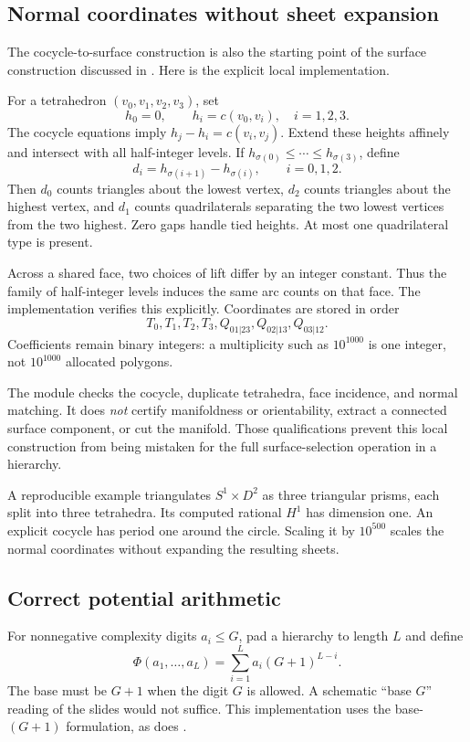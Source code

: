 \documentclass[11pt]{article}
\begin{document}
\subsection{Normal coordinates without sheet expansion}
The cocycle-to-surface construction is also the starting point of the surface
construction discussed in \cite[Theorem~6.2]{lackenby}. Here is the explicit
local implementation.

For a tetrahedron $(v_0,v_1,v_2,v_3)$, set
\[
 h_0=0,\qquad h_i=c(v_0,v_i),\quad i=1,2,3.
\]
The cocycle equations imply $h_j-h_i=c(v_i,v_j)$. Extend these heights affinely
and intersect with all half-integer levels. If
$h_{\sigma(0)}\leq\cdots\leq h_{\sigma(3)}$, define
\[
 d_i=h_{\sigma(i+1)}-h_{\sigma(i)},\qquad i=0,1,2.
\]
Then $d_0$ counts triangles about the lowest vertex, $d_2$ counts triangles
about the highest vertex, and $d_1$ counts quadrilaterals separating the two
lowest vertices from the two highest. Zero gaps handle tied heights. At most
one quadrilateral type is present.

Across a shared face, two choices of lift differ by an integer constant.
Thus the family of half-integer levels induces the same arc counts on that
face. The implementation verifies this explicitly. Coordinates are stored in
order
\[
 T_0,T_1,T_2,T_3,Q_{01|23},Q_{02|13},Q_{03|12}.
\]
Coefficients remain binary integers: a multiplicity such as $10^{1000}$ is one
integer, not $10^{1000}$ allocated polygons.

The module checks the cocycle, duplicate tetrahedra, face incidence, and normal
matching. It does \emph{not} certify manifoldness or orientability, extract a
connected surface component, or cut the manifold. Those qualifications prevent
this local construction from being mistaken for the full surface-selection
operation in a hierarchy.

A reproducible example triangulates $S^1\times D^2$ as three triangular prisms,
each split into three tetrahedra. Its computed rational $H^1$ has dimension one.
An explicit cocycle has period one around the circle. Scaling it by $10^{500}$
scales the normal coordinates without expanding the resulting sheets.

\subsection{Correct potential arithmetic}
For nonnegative complexity digits $a_i\leq G$, pad a hierarchy to length $L$
and define
\[
 \Phi(a_1,\ldots,a_L)=\sum_{i=1}^{L}a_i(G+1)^{L-i}.
\]
The base must be $G+1$ when the digit $G$ is allowed. A schematic ``base $G$''
reading of the slides would not suffice. This implementation uses the
base-$(G+1)$ formulation, as does \cite[Section~9]{lackenby}.
\end{document}
